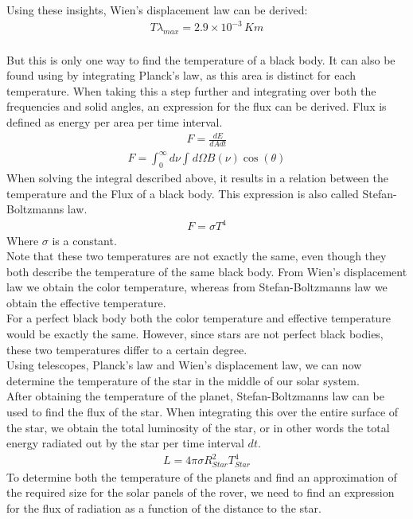 \documentclass[reprint,english,notitlepage]{revtex4-2}
\begin{document}
Using these insights, Wien's displacement law can be derived:
\begin{align*}
    T\lambda_{max} = 2.9 \times 10^{-3} \, Km
\end{align*}\\
But this is only one way to find the temperature of a black body.
It can also be found using by integrating Planck's law, as this area is distinct for each temperature.
When taking this a step further and integrating over both the frequencies and solid angles, an expression for the flux can be derived.
Flux is defined as energy per area per time interval.
\begin{align*}
    F = \frac{dE}{dA dt}
\end{align*}
\begin{align*}
    F = \int_{0}^{\infty} d\nu \int_{}^{} d\Omega B(\nu) \cos\left(\theta\right)
\end{align*}
When solving the integral described above, it results in a relation between the temperature and the Flux of a black body.
This expression is also called Stefan-Boltzmanns law.
\begin{align}
    F = \sigma T^4 \label{stefan_boltzmann_law}
\end{align}
Where $\sigma$ is a constant.\\
Note that these two temperatures are not exactly the same, even though they both describe the temperature of the same black body.
From Wien's displacement law we obtain the color temperature, whereas from Stefan-Boltzmanns law we obtain the effective temperature.\\
For a perfect black body both the color temperature and effective temperature would be exactly the same.
However, since stars are not perfect black bodies, these two temperatures differ to a certain degree.\\
Using telescopes, Planck's law and Wien's displacement law, we can now determine the temperature of the star in the middle of our solar system.\\
After obtaining the temperature of the planet, Stefan-Boltzmanns law can be used to find the flux of the star.
When integrating this over the entire surface of the star, we obtain the total luminosity of the star, or in other words the total energy radiated out by the star per time interval $dt$.
\begin{align}
    L = 4 \pi \sigma R_{Star}^2 T_{Star}^4 \label{Luminosity}
\end{align}
To determine both the temperature of the planets and find an approximation of the required size for the solar panels of the rover, we need to find an expression for the flux of radiation as a function of the distance to the star.
\end{document}
